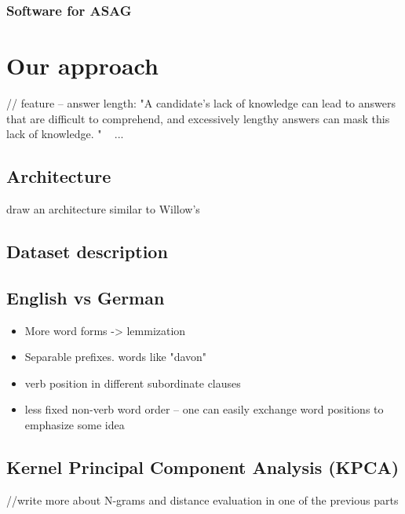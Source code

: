 \documentclass[11pt]{report}
\numberwithin{equation}{section} %
\begin{document}
\subsection{Software for ASAG}




\chapter*{\textbf{Our approach}}

// feature -- answer length: "A
candidate's lack of knowledge can lead to answers that are
difficult to comprehend, and excessively lengthy answers can mask this lack of knowledge. " ~\cite{Thomas}
...

\section{Architecture}

draw an architecture similar to Willow's

\section{Dataset description}

\section*{English vs German}

\begin{itemize}
\item More word forms -> lemmization
\item Separable prefixes. words like "davon"
\item verb position in different subordinate clauses
\item less fixed non-verb word order -- one can easily exchange word positions to emphasize some idea
\end{itemize}

\section*{Kernel Principal Component Analysis (KPCA)}

//write more about N-grams and distance evaluation in one of the previous parts 
\end{document}

